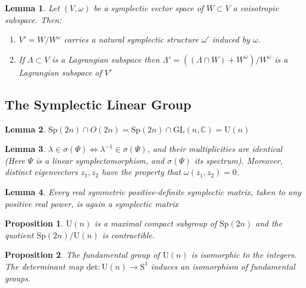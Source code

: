 \documentclass{article}
\newtheorem{prop}{Proposition}
\newtheorem{lem}{Lemma}
\begin{document}
\begin{lem}

Let $(V,\omega)$ be a symplectic vector space of $W \subset V$ a coisotropic subspace. Then: 
\begin{enumerate}
    \item $V'=W/W^{\omega}$ carries a natural symplectic structure $\omega '$ induced by $\omega$.
    \item If $\Lambda \subset V$ is a Lagrangian subspace then $\Lambda ' = ((\Lambda \cap W) + W^{\omega})/W^{\omega}$ is a Lagrangian subspace of $V'$
    
\end{enumerate}

\end{lem}

\subsection{The Symplectic Linear Group}

\begin{lem}

$\mathrm{Sp}(2n) \cap O(2n) = \mathrm{Sp}(2n) \cap \mathrm{GL}(n,\mathbb{C}) = \mathrm{U}(n)$

\end{lem}

\begin{lem}

$\lambda \in \sigma(\Psi) \iff \lambda^{-1} \in \sigma(\Psi)$, and their multiplicities are identical (Here $\Psi$ is a linear symplectomorphism, and $\sigma(\Psi)$ its spectrum). Moreover, distinct eigenvectors $z_1, z_2$ have the property that $\omega(z_1, z_2) = 0$. 

\end{lem}

\begin{lem}

Every real symmetric positive-definite symplectic matrix, taken to any positive real power, is again a symplectic matrix

\end{lem}

\begin{prop}

$\mathrm{U}(n)$ is a maximal compact subgroup of $\mathrm{Sp}(2n)$ and the quotient $\mathrm{Sp}(2n)/\mathrm{U}(n)$ is contractible. 

\end{prop}

\begin{prop}


The fundamental group of $\mathrm{U}(n)$ is isomorphic to the integers. The determinant map $\mathrm{det}: \mathrm{U}(n) \to \mathrm{S}^1$ induces an isomorphism of fundamental groups.

\end{prop}
\end{document}
